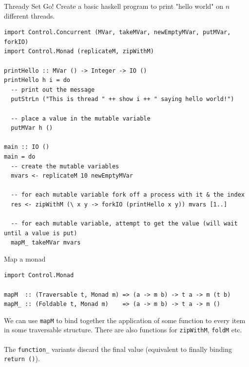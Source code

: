 \begin{examplebox}{Thready Set Go!}
    Create a basic haskell program to print "hello world" on $n$ different threads.
    \tcblower
    \begin{verbatim}
import Control.Concurrent (MVar, takeMVar, newEmptyMVar, putMVar, forkIO)
import Control.Monad (replicateM, zipWithM)

printHello :: MVar () -> Integer -> IO ()
printHello h i = do
  -- print out the message
  putStrLn ("This is thread " ++ show i ++ " saying hello world!")  

  -- place a value in the mutable variable
  putMVar h ()

main :: IO ()
main = do
  -- create the mutable variables
  mvars <- replicateM 10 newEmptyMVar  

  -- for each mutable variable fork off a process with it & the index
  res <- zipWithM (\ x y -> forkIO (printHello x y)) mvars [1..]  

  -- for each mutable variable, attempt to get the value (will wait until a value is put)
  mapM_ takeMVar mvars  
    \end{verbatim}
\end{examplebox}

\begin{sidenotebox}{Map a monad}
    \begin{verbatim}
import Control.Monad

mapM  :: (Traversable t, Monad m) => (a -> m b) -> t a -> m (t b)
mapM_ :: (Foldable t, Monad m)    => (a -> m b) -> t a -> m ()
    \end{verbatim}
    We can use \texttt{mapM} to bind together the application of some function to every item in some traversable structure. There are also functions for \texttt{zipWithM}, \texttt{foldM} etc.
    \\
    \\ The \texttt{function_} variants discard the final value (equivalent to finally binding \texttt{return ()}).
\end{sidenotebox}

